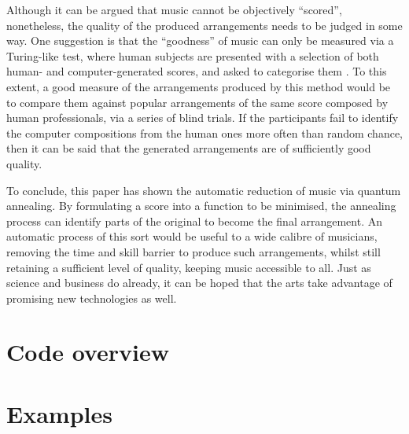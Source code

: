 \documentclass[12pt]{article}
\theoremstyle{definition}
\begin{document}
Although it can be argued that music cannot be objectively ``scored'', nonetheless, the quality of the produced arrangements needs to be judged in some way. One suggestion is that the ``goodness'' of music can only be measured via a Turing-like test, where human subjects are presented with a selection of both human- and computer-generated scores, and asked to categorise them . To this extent, a good measure of the arrangements produced by this method would be to compare them against popular arrangements of the same score composed by human professionals, via a series of blind trials. If the participants fail to identify the computer compositions from the human ones more often than random chance, then it can be said that the generated arrangements are of sufficiently good quality.

To conclude, this paper has shown the automatic reduction of music via quantum annealing. By formulating a score into a function to be minimised, the annealing process can identify parts of the original to become the final arrangement. An automatic process of this sort would be useful to a wide calibre of musicians, removing the time and skill barrier to produce such arrangements, whilst still retaining a sufficient level of quality, keeping music accessible to all. Just as science and business do already, it can be hoped that the arts take advantage of promising new technologies as well.

\printbibliography[heading=bibintoc]

\clearpage
\appendix

\section{Code overview}
\label{app:code}

\section{Examples}
\label{app:examples}
\end{document}
